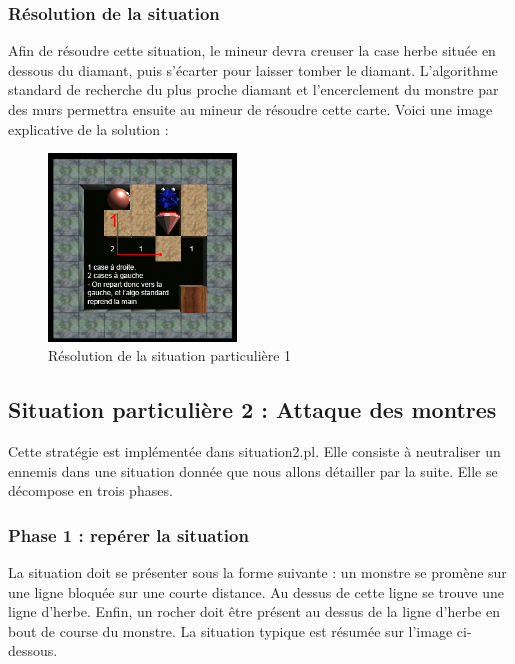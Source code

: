 \documentclass[a4paper,11pt]{article}
\begin{document}
		\subsubsection{R\'esolution de la situation}
		
Afin de r\'esoudre cette situation, le mineur devra creuser la case herbe situ\'ee en dessous du diamant, puis s'\'ecarter pour laisser tomber le diamant. L'algorithme standard de recherche du plus proche diamant et l'encerclement du monstre par des murs permettra ensuite au mineur de r\'esoudre cette carte. Voici une image explicative de la solution :

		\begin{figure}[h]
			\center
			\includegraphics[width=5cm]{situation111}
			\caption{\label{situation1reso} R\'esolution de la situation particuli\`ere 1 }
		\end{figure}
	
	\newpage
	\subsection{Situation particuli\`ere 2 : Attaque des montres}
	
	Cette strat\'egie est impl\'ement\'ee dans situation2.pl. Elle consiste \`a neutraliser un ennemis dans une situation donn\'ee que nous allons d\'etailler par la suite. Elle se d\'ecompose en trois phases.

	\subsubsection{Phase 1 : rep\'erer la situation}
	
La situation doit se pr\'esenter sous la forme suivante : un monstre se prom\`ene sur une ligne bloqu\'ee sur une courte distance. Au dessus de cette ligne se trouve une ligne d'herbe. Enfin, un rocher doit \^etre pr\'esent au dessus de la ligne d'herbe en bout de course du monstre. La situation typique est r\'esum\'ee sur l'image ci-dessous.  
	
\end{document}
